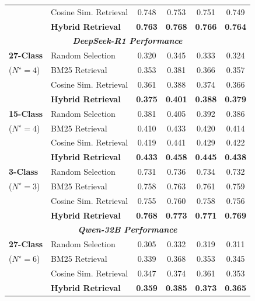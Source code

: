 \begin{table}[H]
\begin{tabular}{@{}llcccc@{}}
                      & Cosine Sim. Retrieval      & 0.748 & 0.753 & 0.751 & 0.749 \\
                      & \textbf{Hybrid Retrieval}  & \textbf{0.763} & \textbf{0.768} & \textbf{0.766} & \textbf{0.764} \\
    \midrule[\heavyrulewidth]
    \multicolumn{6}{c}{\textit{\textbf{DeepSeek-R1 Performance}}} \\
    \midrule
    \textbf{27-Class} & Random Selection & 0.320 & 0.345 & 0.333 & 0.324 \\
    ($N^\star=4$)     & BM25 Retrieval             & 0.353 & 0.381 & 0.366 & 0.357 \\
                      & Cosine Sim. Retrieval      & 0.361 & 0.388 & 0.374 & 0.366 \\
                      & \textbf{Hybrid Retrieval}  & \textbf{0.375} & \textbf{0.401} & \textbf{0.388} & \textbf{0.379} \\
    \midrule
    \textbf{15-Class} & Random Selection & 0.381 & 0.405 & 0.392 & 0.386 \\
    ($N^\star=4$)     & BM25 Retrieval             & 0.410 & 0.433 & 0.420 & 0.414 \\
                      & Cosine Sim. Retrieval      & 0.419 & 0.441 & 0.429 & 0.422 \\
                      & \textbf{Hybrid Retrieval}  & \textbf{0.433} & \textbf{0.458} & \textbf{0.445} & \textbf{0.438} \\
    \midrule
    \textbf{3-Class}  & Random Selection & 0.731 & 0.736 & 0.734 & 0.732 \\
    ($N^\star=3$)     & BM25 Retrieval             & 0.758 & 0.763 & 0.761 & 0.759 \\
                      & Cosine Sim. Retrieval      & 0.755 & 0.760 & 0.758 & 0.756 \\
                      & \textbf{Hybrid Retrieval}  & \textbf{0.768} & \textbf{0.773} & \textbf{0.771} & \textbf{0.769} \\
    \midrule[\heavyrulewidth]
    \multicolumn{6}{c}{\textit{\textbf{Qwen-32B Performance}}} \\
    \midrule
    \textbf{27-Class} & Random Selection & 0.305 & 0.332 & 0.319 & 0.311 \\
    ($N^\star=6$)     & BM25 Retrieval             & 0.339 & 0.368 & 0.353 & 0.345 \\
                      & Cosine Sim. Retrieval      & 0.347 & 0.374 & 0.361 & 0.353 \\
                      & \textbf{Hybrid Retrieval}  & \textbf{0.359} & \textbf{0.385} & \textbf{0.373} & \textbf{0.365} \\

\end{tabular}
\end{table}
